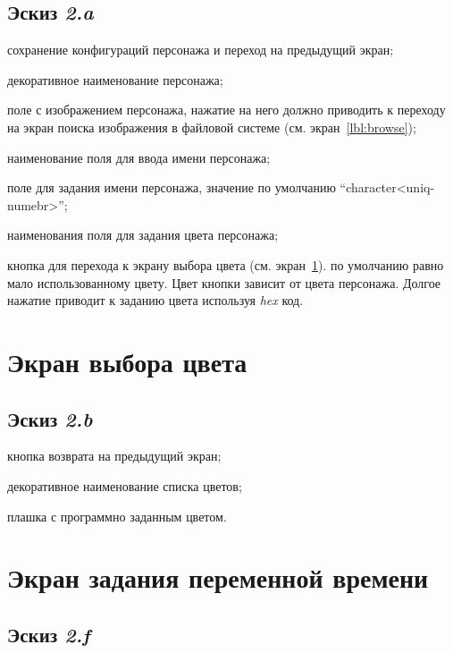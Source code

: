 \subsection{Эскиз \emph{2.a}}
\begin{enumerate*}
    \item сохранение конфигураций персонажа и переход на предыдущий экран;
    \item декоративное наименование персонажа;
    \item поле с изображением персонажа, нажатие на него должно приводить к переходу на экран поиска изображения в файловой системе (см. экран~\ref{lbl:browse});
    \item наименование поля для ввода имени персонажа;
    \item поле для задания имени персонажа, значение по умолчанию ``character<uniq-numebr>'';
    \item наименования поля для задания цвета персонажа;
    \item кнопка для перехода к экрану выбора цвета (см. экран~\ref{lbl:game-color}). по умолчанию равно мало использованному цвету. Цвет кнопки зависит от цвета персонажа. Долгое нажатие приводит к заданию цвета используя \emph{hex} код.
\end{enumerate*}


\section{Экран выбора цвета}\label{lbl:game-color}

\subsection{Эскиз \emph{2.b}}
\begin{enumerate*}
    \item кнопка возврата на предыдущий экран;
    \item декоративное наименование списка цветов;
    \item плашка с программно заданным цветом.
\end{enumerate*}

\section{Экран задания переменной времени}\label{lbl:game-time-var}

\subsection{Эскиз \emph{2.f}}

